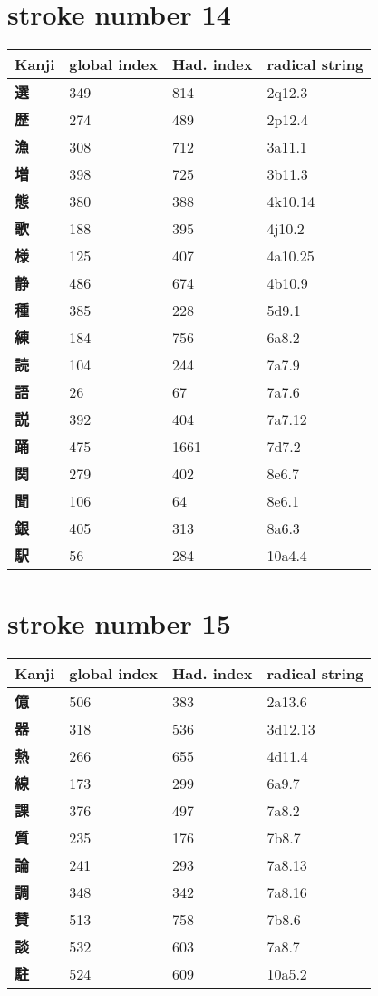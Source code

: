 \section{stroke number 14}
  \begin{longtable}[c]{llll}
    \bfseries Kanji & \bfseries global index & \bfseries Had. index & \bfseries radical string\\\hline\endhead
    \bfseries 選 & 349 & 814 & 2q12.3\\
    \bfseries 歴 & 274 & 489 & 2p12.4\\
    \bfseries 漁 & 308 & 712 & 3a11.1\\
    \bfseries 増 & 398 & 725 & 3b11.3\\
    \bfseries 態 & 380 & 388 & 4k10.14\\
    \bfseries 歌 & 188 & 395 & 4j10.2\\
    \bfseries 様 & 125 & 407 & 4a10.25\\
    \bfseries 静 & 486 & 674 & 4b10.9\\
    \bfseries 種 & 385 & 228 & 5d9.1\\
    \bfseries 練 & 184 & 756 & 6a8.2\\
    \bfseries 読 & 104 & 244 & 7a7.9\\
    \bfseries 語 & 26 & 67 & 7a7.6\\
    \bfseries 説 & 392 & 404 & 7a7.12\\
    \bfseries 踊 & 475 & 1661 & 7d7.2\\
    \bfseries 関 & 279 & 402 & 8e6.7\\
    \bfseries 聞 & 106 & 64 & 8e6.1\\
    \bfseries 銀 & 405 & 313 & 8a6.3\\
    \bfseries 駅 & 56 & 284 & 10a4.4\\
  \end{longtable}
\section{stroke number 15}
  \begin{longtable}[c]{llll}
    \bfseries Kanji & \bfseries global index & \bfseries Had. index & \bfseries radical string\\\hline\endhead
    \bfseries 億 & 506 & 383 & 2a13.6\\
    \bfseries 器 & 318 & 536 & 3d12.13\\
    \bfseries 熱 & 266 & 655 & 4d11.4\\
    \bfseries 線 & 173 & 299 & 6a9.7\\
    \bfseries 課 & 376 & 497 & 7a8.2\\
    \bfseries 質 & 235 & 176 & 7b8.7\\
    \bfseries 論 & 241 & 293 & 7a8.13\\
    \bfseries 調 & 348 & 342 & 7a8.16\\
    \bfseries 賛 & 513 & 758 & 7b8.6\\
    \bfseries 談 & 532 & 603 & 7a8.7\\
    \bfseries 駐 & 524 & 609 & 10a5.2\\
  \end{longtable}

